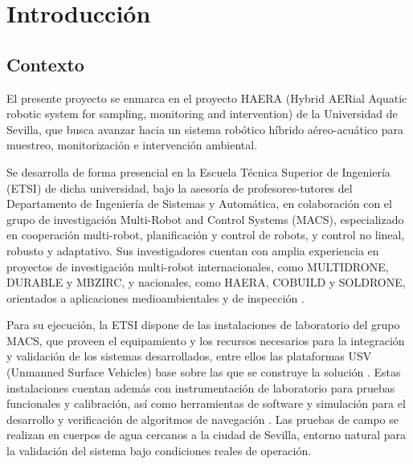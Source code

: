 
\chapter{Introducción}
\label{chp:intro}

\section{Contexto}


El presente proyecto se enmarca en el proyecto HAERA (Hybrid AERial Aquatic robotic system for sampling, monitoring and intervention) de la Universidad de Sevilla, 
que busca avanzar hacia un sistema robótico híbrido aéreo-acuático para muestreo, monitorización e intervención ambiental\cite{Cite2}. 

Se desarrolla de forma presencial en la 
Escuela Técnica Superior de Ingeniería (ETSI) de dicha universidad, bajo la asesoría de profesores-tutores del Departamento de Ingeniería de Sistemas y Automática, 
en colaboración con el grupo de investigación Multi-Robot and Control Systems (MACS)\cite{Cite3}, especializado en cooperación multi-robot, planificación y control de robots, 
y control no lineal, robusto y adaptativo. Sus investigadores cuentan con amplia experiencia en proyectos de investigación multi-robot internacionales, como MULTIDRONE, 
DURABLE y MBZIRC, y nacionales, como HAERA, COBUILD y SOLDRONE, orientados a aplicaciones medioambientales y de inspección \cite{Cite3}.

Para su ejecución, la ETSI dispone de las instalaciones de laboratorio del grupo MACS, que proveen el equipamiento y los recursos necesarios para la integración y 
validación de los sistemas desarrollados, entre ellos las plataformas USV (Unmanned Surface Vehicles) base sobre las que se construye la solución \cite{Cite3}. Estas 
instalaciones cuentan además con instrumentación de laboratorio para pruebas funcionales y calibración, así como herramientas de software y simulación para el desarrollo 
y verificación de algoritmos de navegación \cite{Cite3}. Las pruebas de campo se realizan en cuerpos de agua cercanos a la ciudad de Sevilla, entorno natural para la 
validación del sistema bajo condiciones reales de operación.

\newpage

